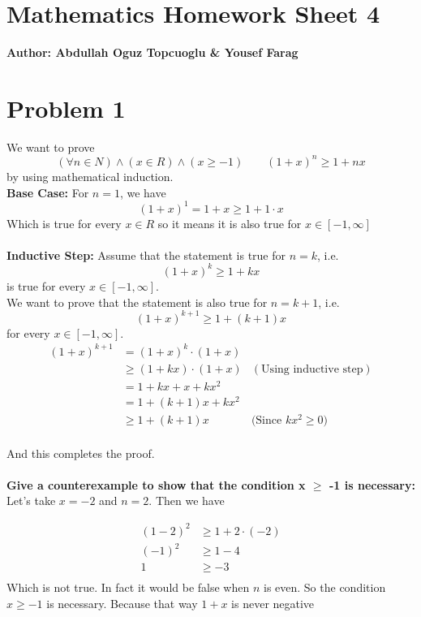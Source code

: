 \documentclass{article}
\begin{document}
\section*{\huge Mathematics Homework Sheet 4}
\begin{flushright}
   \textbf{Author: Abdullah Oguz Topcuoglu \& Yousef Farag}
\end{flushright}

\section*{Problem 1}
We want to prove
\[
   (\forall n \in N) \land (x \in R) \land (x \geq -1) \qquad (1 + x)^n \geq 1 + nx
\]
by using mathematical induction.\\
\textbf{Base Case:} For $n = 1$, we have
\[
   (1 + x)^1 = 1 + x \geq 1 + 1 \cdot x
\]
Which is true for every \(x \in R\) so it means it is also true for \(x \in [-1, \infty]\)\\
\\
\textbf{Inductive Step:} Assume that the statement is true for \(n = k\), i.e.
\[
   (1 + x)^k \geq 1 + kx
\]
is true for every \(x \in [-1, \infty]\).\\
We want to prove that the statement is also true for \(n = k + 1\), i.e.
\[
   (1 + x)^{k + 1} \geq 1 + (k + 1)x
\]
for every \(x \in [-1, \infty]\).\\

\begin{align}
   (1 + x)^{k + 1} & = (1 + x)^k \cdot (1 + x)                                                                                  \\
                   & \geq (1 + kx) \cdot (1 + x) & (\text{Using inductive step}) \label{eg:step2}                                                 \\
                   & = 1 + kx + x + kx^2                                                                                        \\
                   & = 1 + (k + 1)x + kx^2                                                                                      \\
                   & \geq 1 + (k + 1)x            &\text{(Since \(kx^2 \geq 0\))}
\end{align}
\\
And this completes the proof.
\\
\\
\textbf{Give a counterexample to show that the condition x \(\geq\) -1 is necessary:}\\
Let's take \(x = -2\) and \(n = 2\). Then we have

\begin{align*}
   (1 - 2)^2 &\geq 1 + 2 \cdot (-2) \\
   (-1)^2    &\geq 1 - 4            \\
   1         &\geq -3               \\
\end{align*}
Which is not true. In fact it would be false when \(n\) is even. So the condition \(x \geq -1\) is necessary. Because that way \(1 + x\) is never negative
\end{document}
